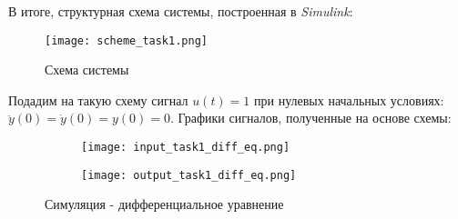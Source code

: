 \newpage
В итоге, структурная схема системы, построенная в \textit{Simulink}:

\begin{figure}[ht]
    \centering
    \texttt{[image: scheme\_task1.png]}
	\caption{Схема системы}
\end{figure}

Подадим на такую схему сигнал $u(t)=1$ при нулевых начальных условиях: $\ddot{y}(0)=\dot{y}(0)=y(0)=0$. Графики сигналов, полученные на основе схемы:
\begin{figure}[h]
	\begin{subfigure}{0.5\textwidth}
		\texttt{[image: input\_task1\_diff\_eq.png]} 
	\end{subfigure}
	\begin{subfigure}{0.5\textwidth}
		\texttt{[image: output\_task1\_diff\_eq.png]}
	\end{subfigure}
	\caption{Симуляция - дифференциальное уравнение}
\end{figure}

\endinput